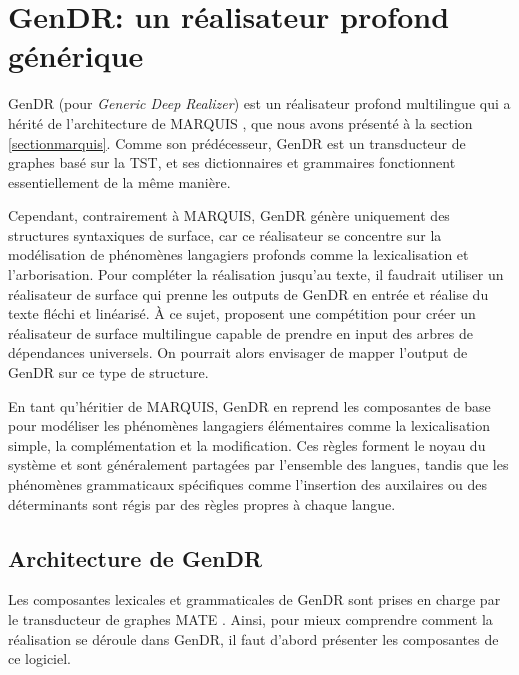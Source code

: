 
\chapter{GenDR: un réalisateur profond générique}\label{chapgendr}

GenDR (pour \emph{Generic Deep Realizer}) est un réalisateur profond multilingue \citep{lareau18} qui a hérité de l'architecture de MARQUIS \citep{WannerMARQUISGENERATIONUSERTAILORED2010}, que nous avons présenté à la section \ref{sectionmarquis}. Comme son prédécesseur, GenDR est un transducteur de graphes basé sur la \ac{TST}, et ses dictionnaires et grammaires fonctionnent essentiellement de la même manière.

Cependant, contrairement à MARQUIS, GenDR génère uniquement des structures syntaxiques de surface, car ce réalisateur se concentre sur la modélisation de phénomènes langagiers profonds comme la lexicalisation et l'arborisation. Pour compléter la réalisation jusqu'au texte, il faudrait utiliser un réalisateur de surface qui prenne les outputs de GenDR en entrée et réalise du texte fléchi et linéarisé. À ce sujet, \cite{MilleSharedTaskProposal2017a} proposent une compétition pour créer un réalisateur de surface multilingue capable de prendre en input des arbres de dépendances universels. On pourrait alors envisager de mapper l'output de GenDR sur ce type de structure.

En tant qu'héritier de MARQUIS, GenDR en reprend les composantes de base pour modéliser les phénomènes langagiers élémentaires comme la lexicalisation simple, la complémentation et la modification. Ces règles forment le noyau du système et sont généralement partagées par l'ensemble des langues, tandis que les phénomènes grammaticaux spécifiques comme l'insertion des auxilaires ou des déterminants sont régis par des règles propres à chaque langue.

\section{Architecture de GenDR}

Les composantes lexicales et grammaticales de GenDR sont prises en charge par le transducteur de graphes MATE \citep{BohnetDevelopmentEnvironmentMTTbased2000a,BOHNET10}. Ainsi, pour mieux comprendre comment la réalisation se déroule dans GenDR, il faut d'abord présenter les composantes de ce logiciel.

